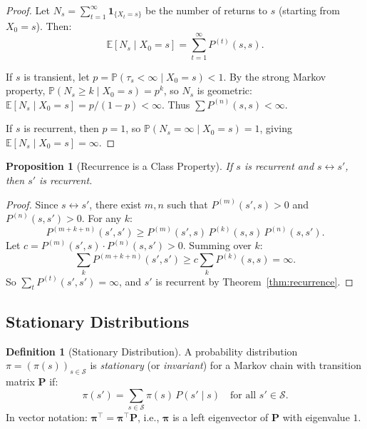 \documentclass[11pt,a4paper]{article}
\theoremstyle{definition}
\newtheorem{definition}{Definition}[section]
\theoremstyle{plain}
\newtheorem{proposition}[theorem]{Proposition}
\theoremstyle{remark}
\newcommand{\E}{\mathbb{E}}
\newcommand{\Prob}{\mathbb{P}}
\newcommand{\indicator}{\mathbf{1}}
\begin{document}
\begin{proof}
Let $N_s = \sum_{t=1}^\infty \indicator_{\{X_t = s\}}$ be the number of returns to $s$ (starting from $X_0 = s$). Then:
\begin{equation}
    \E[N_s \mid X_0 = s] = \sum_{t=1}^\infty P^{(t)}(s, s).
\end{equation}

If $s$ is transient, let $p = \Prob(\tau_s < \infty \mid X_0 = s) < 1$. By the strong Markov property, $\Prob(N_s \geq k \mid X_0 = s) = p^k$, so $N_s$ is geometric: $\E[N_s \mid X_0 = s] = p/(1-p) < \infty$. Thus $\sum P^{(n)}(s,s) < \infty$.

If $s$ is recurrent, then $p = 1$, so $\Prob(N_s = \infty \mid X_0 = s) = 1$, giving $\E[N_s \mid X_0 = s] = \infty$.
\end{proof}

\begin{proposition}[Recurrence is a Class Property]
\label{prop:recurrence_class}
If $s$ is recurrent and $s \leftrightarrow s'$, then $s'$ is recurrent.
\end{proposition}

\begin{proof}
Since $s \leftrightarrow s'$, there exist $m, n$ such that $P^{(m)}(s', s) > 0$ and $P^{(n)}(s, s') > 0$. For any $k$:
\begin{equation}
    P^{(m+k+n)}(s', s') \geq P^{(m)}(s', s)\, P^{(k)}(s, s)\, P^{(n)}(s, s').
\end{equation}
Let $c = P^{(m)}(s', s) \cdot P^{(n)}(s, s') > 0$. Summing over $k$:
\begin{equation}
    \sum_k P^{(m+k+n)}(s', s') \geq c \sum_k P^{(k)}(s, s) = \infty.
\end{equation}
So $\sum_t P^{(t)}(s', s') = \infty$, and $s'$ is recurrent by Theorem~\ref{thm:recurrence}.
\end{proof}

\subsection{Stationary Distributions}
\label{subsec:stationary}

\begin{definition}[Stationary Distribution]
\label{def:stationary}
A probability distribution $\pi = (\pi(s))_{s \in \mathcal{S}}$ is \emph{stationary} (or \emph{invariant}) for a Markov chain with transition matrix $\mathbf{P}$ if:
\begin{equation}
    \pi(s') = \sum_{s \in \mathcal{S}} \pi(s)\, P(s' \mid s) \quad \text{for all } s' \in \mathcal{S}.
    \label{eq:stationary}
\end{equation}
In vector notation: $\boldsymbol{\pi}^\top = \boldsymbol{\pi}^\top \mathbf{P}$, i.e., $\boldsymbol{\pi}$ is a left eigenvector of $\mathbf{P}$ with eigenvalue $1$.
\end{definition}
\end{document}
